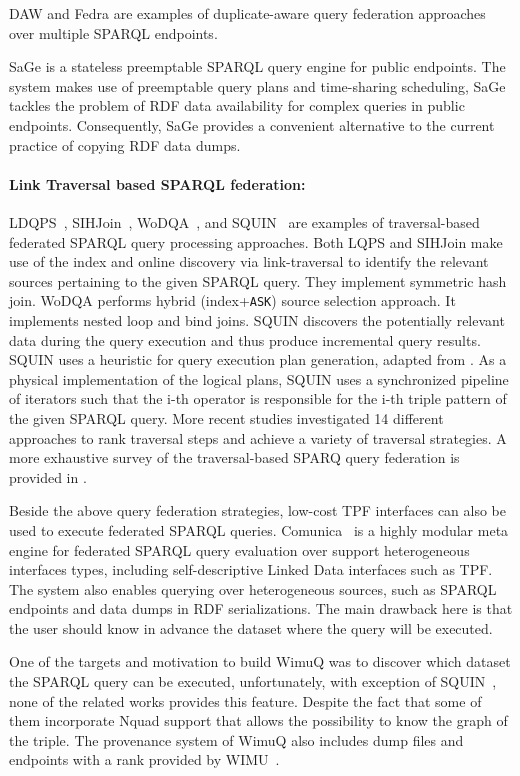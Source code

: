 DAW \cite{daw2013} 
and Fedra \cite{fedra2015} are examples of duplicate-aware query federation approaches over multiple SPARQL endpoints. 

SaGe\cite{DBLP:journals/corr/abs-1806-00227} is a stateless preemptable SPARQL query engine for public endpoints. The system makes use of preemptable query plans and time-sharing scheduling, SaGe tackles the problem of RDF data availability for complex queries in public endpoints. Consequently, SaGe provides a convenient alternative to the current practice of copying RDF data dumps.

\paragraph*{\textbf{Link Traversal based SPARQL federation:}} LDQPS~\cite{ldqp2010}, SIHJoin~\cite{sihjoin2011}, WoDQA~\cite{wodqa2012}, and SQUIN~\cite{hartig2013squin} are examples of traversal-based federated SPARQL query processing approaches.  
Both LQPS and SIHJoin make use of the index and  online discovery via link-traversal to identify the relevant sources pertaining to the given SPARQL query. They implement symmetric hash join. WoDQA performs hybrid (index+\texttt{ASK}) source selection approach. It implements nested loop and bind joins. SQUIN discovers the potentially relevant data during the query execution and thus produce incremental query results. SQUIN uses a heuristic for query execution plan generation, adapted from \cite{zk2011}. As a physical implementation of the logical plans, SQUIN uses a synchronized pipeline of iterators such that the i-th operator is responsible for the i-th triple pattern of the given SPARQL query. More recent studies \cite{hartig2016walking} investigated 14 different approaches to rank traversal steps and achieve a variety of traversal strategies. 
A more exhaustive survey of the traversal-based SPARQ query federation is provided in \cite{hartig2009executing}. 

Beside the above query federation strategies, low-cost \ac{TPF} interfaces \cite{verborgh2016triple} can also be used to execute federated SPARQL queries. Comunica~\cite{taelman2018comunica} is a highly modular meta engine for federated SPARQL query evaluation over support heterogeneous interfaces types, including self-descriptive Linked Data interfaces such as TPF. The system also enables querying over heterogeneous sources, such as SPARQL endpoints and data dumps in RDF serializations. The main drawback here is that the user should know in advance the dataset where the query will be executed.

One of the targets and motivation to build WimuQ was to discover which dataset the SPARQL query can be executed, unfortunately, with exception of SQUIN~\cite{hartig2013squin}, none of the related works provides this feature. Despite the fact that some of them incorporate Nquad support that allows the possibility to know the graph of the triple. The provenance system of WimuQ also includes dump files and endpoints with a rank provided by WIMU~\cite{valdestilhas2018my}.